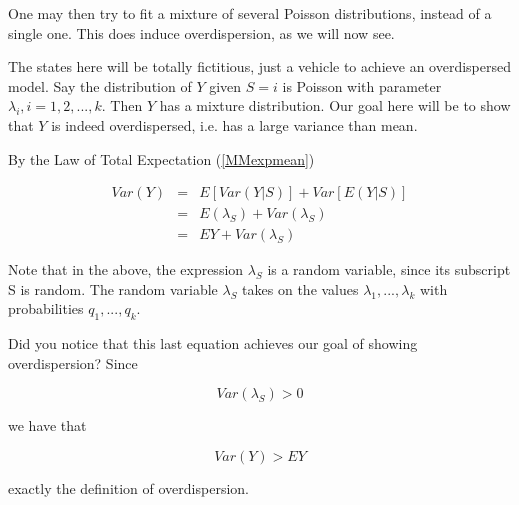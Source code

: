 \documentclass[11pt]{article}
\begin{document}
One may then try to fit a mixture of several Poisson distributions,
instead of a single one.  This does induce overdispersion, as we will
now see.  

The states here will be totally fictitious, just a vehicle to achieve an
overdispersed model.  Say the distribution of $Y$ given $S = i$ is
Poisson with parameter $\lambda_i, i = 1,2,...,k$.  Then $Y$ has a
mixture distribution.  Our goal here will be to show that $Y$ is indeed
overdispersed, i.e. has a large variance than mean.

By the Law of Total Expectation (\ref{MMexpmean})

\begin{eqnarray}
Var(Y) &=& E[Var(Y|S)] + Var[E(Y|S)] \\ 
&=& E(\lambda_S) + Var(\lambda_S) \\
&=& EY + Var(\lambda_S) \label{thislast} 
\end{eqnarray}


Note that in the above, the expression $\lambda_S$ is a random variable,
since its subscript S is random.  The random variable $\lambda_S$ takes
on the values $\lambda_1,...,\lambda_k$ with probabilities
$q_1,...,q_k$.

Did you notice that this last equation achieves our goal of showing
overdispersion?  Since

\begin{equation}
Var(\lambda_S) > 0
\end{equation}

we have that

\begin{equation}
Var(Y) > EY
\end{equation}

exactly the definition of overdispersion.

% 
% 
% 
% 
% 
% 
% 
% 
% 
\end{document}
